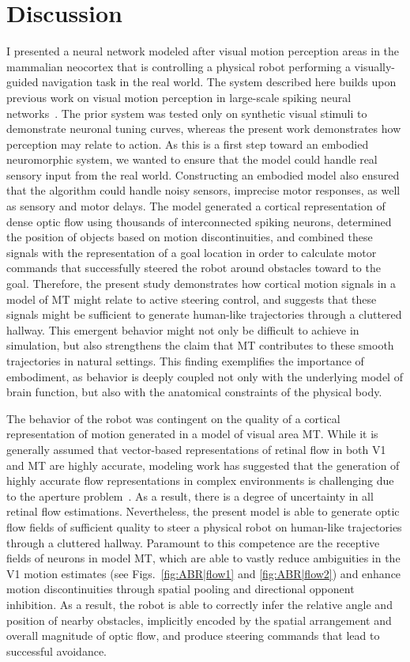 \section{Discussion}
I presented a neural network modeled after visual motion
perception areas in the mammalian neocortex that is controlling
a physical robot performing a visually-guided navigation task in
the real world. The system described here builds upon previous
work on visual motion perception in large-scale spiking neural
networks~\citep{Beyeler2014}.
The prior system was tested only on synthetic visual stimuli 
to demonstrate neuronal tuning
curves, whereas the present work demonstrates how perception
may relate to action. As this is a first step toward an embodied
neuromorphic system, we wanted to ensure that the model
could handle real sensory input from the real world. Constructing
an embodied model also ensured that the algorithm could handle
noisy sensors, imprecise motor responses, as well as sensory
and motor delays. The model generated a cortical representation
of dense optic flow using thousands of interconnected spiking neurons,
determined the position of objects based on motion discontinuities,
and combined these signals with the representation of a
goal location in order to calculate motor commands that successfully
steered the robot around obstacles toward to the goal. Therefore,
the present study demonstrates how cortical motion signals
in a model of \ac{MT} might relate to active steering control, 
and suggests that these signals might be sufficient to generate 
human-like trajectories through a cluttered hallway. This emergent
behavior might not only be difficult to achieve in simulation, but
also strengthens the claim that \ac{MT} contributes to these smooth
trajectories in natural settings.
This finding exemplifies the importance of embodiment, as behavior 
is deeply coupled not only with
the underlying model of brain function, but also with the anatomical
constraints of the physical body.

The behavior of the robot was contingent on the quality of
a cortical representation of motion generated in a model of
visual area \ac{MT}. While it is generally assumed that vector-based
representations of retinal flow in both \ac{V1} and \ac{MT} are highly
accurate, modeling work has suggested that the generation of
highly accurate flow representations in complex environments
is challenging due to the aperture 
problem~\citep{Baloch1997,Bayerl2004,Chey1997,SimoncelliHeeger1998}.
As a result, there is a degree
of uncertainty in all retinal flow estimations. Nevertheless, the
present model is able to generate optic flow fields of sufficient
quality to steer a physical robot on human-like trajectories
through a cluttered hallway. Paramount to this competence are
the receptive fields of neurons in model \ac{MT}, which are able to
vastly reduce ambiguities in the \ac{V1} motion estimates 
(see Figs.~\ref{fig:ABR|flow1} and \ref{fig:ABR|flow2})
and enhance motion discontinuities through spatial pooling
and directional opponent inhibition. As a result, the robot is
able to correctly infer the relative angle and position of nearby
obstacles, implicitly encoded by the spatial arrangement and
overall magnitude of optic flow, and produce steering commands
that lead to successful avoidance.

